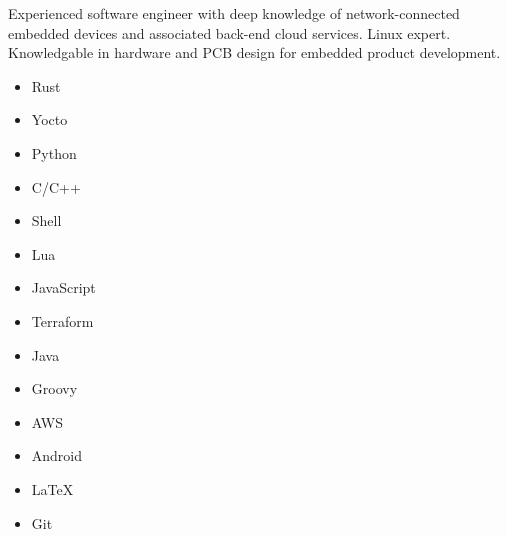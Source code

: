 \documentclass[10pt, letterpaper]{developercv}
\begin{document}
\begin{cvminipage}{0.5}
    Experienced software engineer with deep knowledge of network-connected
    embedded devices and associated back-end cloud services. Linux expert.
    Knowledgable in hardware and PCB design for embedded product development.
\end{cvminipage}
\hfill
\begin{cvminipage}{0.45}
    \begin{cvminipage}{0.3}
        \begin{itemize}[nosep]
            \item Rust
            \item Yocto
            \item Python
            \item C/C++
            \item Shell
        \end{itemize}
    \end{cvminipage}
    \hfill
    \begin{cvminipage}{0.3}
        \begin{itemize}[nosep]
            \item Lua
            \item JavaScript
            \item Terraform
            \item Java
            \item Groovy
        \end{itemize}
    \end{cvminipage}
    \hfill
    \begin{cvminipage}{0.3}
        \begin{itemize}[nosep]
            \item AWS
            \item Android
            \item \LaTeX
            \item Git
        \end{itemize}
    \end{cvminipage}
\end{cvminipage}
\vspace{3ex}


\end{document}
